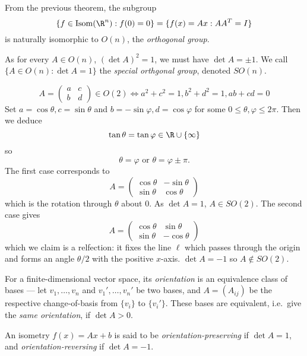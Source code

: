 \documentclass[a4paper]{article}
\DeclareMathOperator{\Isom}{Isom}
\begin{document}
From the previous theorem, the subgroup
\[
  \{f \in \Isom(\R^n): f(0) = 0\} = \{f(x) = Ax: AA^T = I\}
\]
is naturally isomorphic to \(O(n)\), the \emph{orthogonal group}.

As for every \(A \in O(n)\), \((\det A)^2 = 1\), we must have \(\det A = \pm 1\). We call \(\{A \in O(n): \det A = 1\}\) the \emph{special orthgonal group}, denoted \(SO(n)\).

\begin{eg}[\(O(2)\)]
  \[
    A =
    \begin{pmatrix}
      a & c \\
      b & d
    \end{pmatrix}
    \in O(2) \Leftrightarrow a^2 + c^2 = 1, b^2 + d^2 = 1, ab + cd = 0
  \]
  Set \(a = \cos \theta, c = \sin \theta\) and \(b = - \sin \varphi, d = \cos \varphi\) for some \(0 \leq \theta, \varphi \leq 2\pi\). Then we deduce
  \[
    \tan \theta = \tan \varphi \in \R \cup \{\infty\}
  \]
  so
  \[
    \theta = \varphi \text{ or } \theta = \varphi \pm \pi.
  \]
  The first case corresponds to
  \[
    A =
    \begin{pmatrix}
      \cos \theta & -\sin \theta \\
      \sin \theta & \cos \theta
    \end{pmatrix}
  \]
  which is the rotation through \(\theta\) about \(0\). As \(\det A = 1\), \(A \in SO(2)\). The second case gives
  \[
    A =
    \begin{pmatrix}
      \cos \theta & \sin \theta \\
      \sin \theta & - \cos \theta
    \end{pmatrix}
  \]
  which we claim is a relfection: it fixes the line \(\ell\) which passes through the origin and forms an angle \(\theta/2\) with the positive \(x\)-axis. \(\det A = -1\) so \(A \notin SO(2)\).
\end{eg}

\begin{remark}[Orientation]
  For a finite-dimensional vector space, its \emph{orientation} is an equivalence class of bases --- let \(v_1, \dots, v_n\) and \(v_1', \dots, v_n'\) be two bases, and \(A = (A_{ij})\) be the respective change-of-basis from \(\{v_i\}\) to \(\{v_i'\}\). These bases are equivalent, i.e.\ give the \emph{same orientation}, if \(\det A > 0\).
\end{remark}

\begin{definition}
  An isometry \(f(x) = Ax + b\) is said to be \emph{orientation-preserving} if \(\det A = 1\), and \emph{orientation-reversing} if \(\det A = -1\).
\end{definition}
\end{document}
